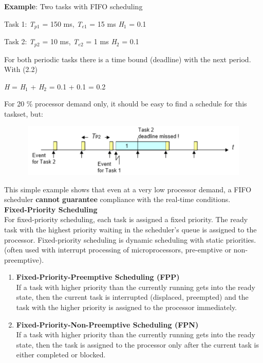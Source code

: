 \textbf{Example}: Two tasks with FIFO scheduling

Task 1: \textit{T}${}_{p1}$ = 150 ms, \textit{T}${}_{e1}$ = 15 ms   \textit{H}${}_{1}$ = 0.1

Task 2: \textit{T}${}_{p2}$ = 10 ms,  \textit{T}${}_{e2}$ = 1 ms    \textit{H}${}_{2}$ = 0.1

For both periodic tasks there is a time bound (deadline) with the next period. With (2.2) 

\textit{H} = \textit{H}${}_{1}$ + \textit{H}${}_{2}$ = 0.1 + 0.1 = 0.2 

For 20 \% processor demand only, it should be easy to find a schedule for this taskset, but:

 	\begin{figure}[h]
    \centering
    \includegraphics[width=12cm, height=2.5cm]{Images/image98.png}
    \label{fig:Fig 43}
    \end{figure}

This simple example shows that even at a very low processor demand, a FIFO scheduler \textbf{cannot} \textbf{guarantee} compliance with the real-time conditions.\\

{\rot\bf Fixed-Priority Scheduling}\\

For fixed-priority scheduling, each task is assigned a fixed priority. The ready task with the highest priority waiting in the scheduler's queue is assigned to the processor. Fixed-priority scheduling is dynamic scheduling with static priorities. (often used with interrupt processing of microprocessors, pre-emptive or non-preemptive).

\begin{enumerate}
	\item  \textbf{Fixed-Priority-Preemptive Scheduling (FPP)}\\
	If a task with higher priority than the currently running gets into the ready state, then the current task is interrupted (displaced, preempted) and the task with the higher priority is assigned to the processor immediately.
	
	\item  \textbf{Fixed-Priority-Non-Preemptive Scheduling (FPN)}\\
	If a task with higher priority than the currently running gets into the ready state, then the task is assigned to the processor only after the current task is either completed or blocked.
\end{enumerate}

